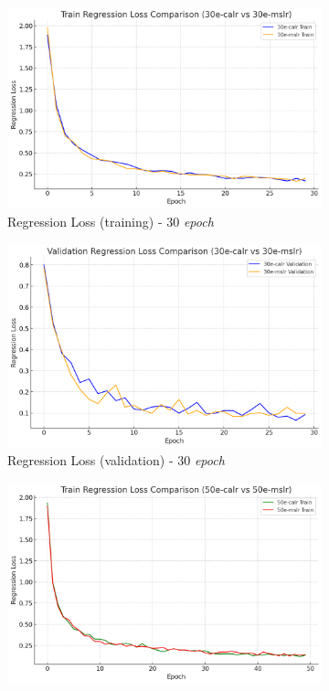 \begin{figure}[htbp]
  \centering
  \begin{subfigure}{0.45\textwidth}
    \includegraphics[width=\textwidth]{gambar/bab4-train-regloss-30e.png}
    \caption{Regression Loss (training) - 30 \emph{epoch}}
  \end{subfigure}
  \hfill
  \begin{subfigure}{0.45\textwidth}
    \includegraphics[width=\textwidth]{gambar/bab4-val-regloss-30e.png}
    \caption{Regression Loss (validation) - 30 \emph{epoch}}
  \end{subfigure}
  \hfill
  \begin{subfigure}{0.45\textwidth}
    \includegraphics[width=\textwidth]{gambar/bab4-train-regloss-50e.png}

\end{subfigure}
\end{figure}
